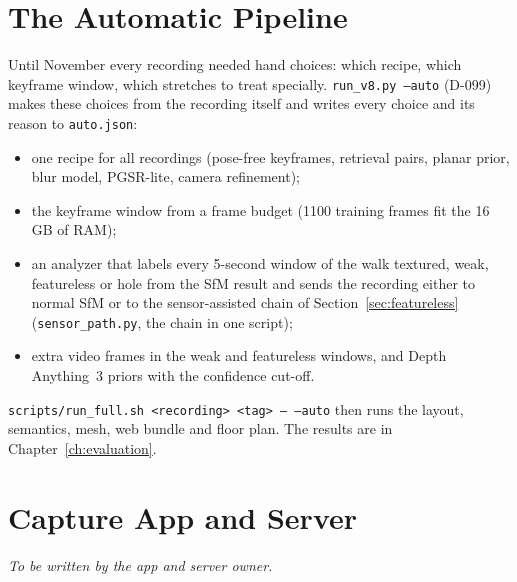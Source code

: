 \section{The Automatic Pipeline}
\label{sec:auto}
Until November every recording needed hand choices: which recipe, which keyframe window, which stretches to treat
specially. \texttt{run\_v8.py --auto} (D-099) makes these choices from the recording itself and writes every choice and
its reason to \texttt{auto.json}:
\begin{itemize}
    \item one recipe for all recordings (pose-free keyframes, retrieval pairs, planar prior, blur model, PGSR-lite,
          camera refinement);
    \item the keyframe window from a frame budget (1100 training frames fit the 16\,GB of RAM);
    \item an analyzer that labels every 5-second window of the walk textured, weak, featureless or hole from the SfM
          result and sends the recording either to normal SfM or to the sensor-assisted chain of
          Section~\ref{sec:featureless} (\texttt{sensor\_path.py}, the chain in one script);
    \item extra video frames in the weak and featureless windows, and Depth Anything~3 priors with the confidence cut-off.
\end{itemize}
\texttt{scripts/run\_full.sh <recording> <tag> -- --auto} then runs the layout, semantics, mesh, web bundle and floor plan.
The results are in Chapter~\ref{ch:evaluation}.

\section{Capture App and Server}
\textit{To be written by the app and server owner.}
